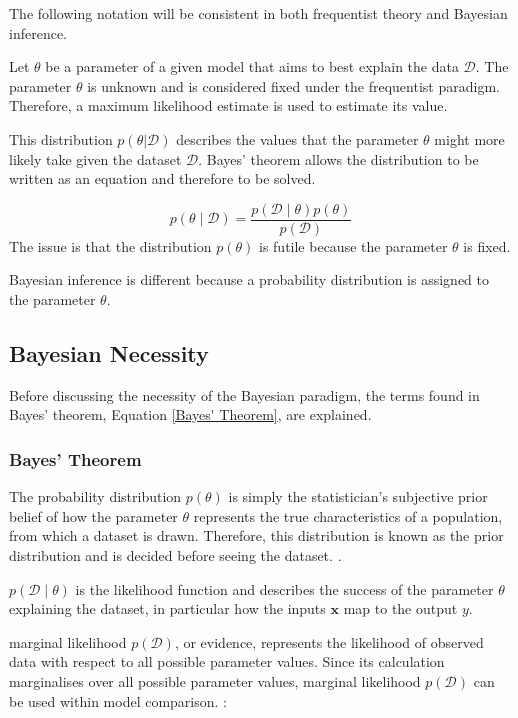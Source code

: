 \documentclass[12pt,a4paper]{article}
\begin{document}
The following notation will be consistent in both frequentist theory and Bayesian inference.

Let \(\theta\) be a parameter of a given model that aims to best explain the data \(\mathcal{D}\). The parameter \(\theta\) is unknown and is considered fixed under the frequentist paradigm. Therefore, a maximum likelihood estimate is used to estimate its value.

This distribution \(p(\theta|\mathcal{D})\) describes the values that the parameter \(\theta\) might more likely take given the dataset \(\mathcal{D}\). Bayes' theorem allows the distribution to be written as an equation and therefore to be solved.

\begin{equation}
p(\theta\mid\mathcal{D}) = \frac{p(\mathcal{D}\mid\theta)p(\theta)}{p(\mathcal{D})}
\label{Bayes' Theorem}
\end{equation}
The issue is that the distribution \(p(\theta)\) is futile because the parameter \(\theta\) is fixed. 

Bayesian inference is different because a probability distribution is assigned to the parameter \(\theta\).

\subsection{Bayesian Necessity}

Before discussing the necessity of the Bayesian paradigm, the terms found in Bayes' theorem, Equation \eqref{Bayes' Theorem}, are explained.

\subsubsection{Bayes' Theorem}
\label{sec:Bayes' Theorem}
The probability distribution \(p(\theta)\) is simply the statistician's subjective prior belief of how the parameter \(\theta\) represents the true characteristics of a population,  from which a dataset is drawn. Therefore, this distribution is known as the prior distribution and is decided before seeing the dataset. \citep{hoff2009first}.

\(p(\mathcal{D}\mid\theta)\) is the likelihood function and describes the success of the parameter \(\theta\) explaining the dataset, in particular how the inputs \(\bm{\mathbf{x}}\) map to the output \(y\).

marginal likelihood \(p(\mathcal{D})\), or evidence, represents the likelihood of observed data with respect to all possible parameter values. Since its calculation marginalises over all possible parameter values, marginal likelihood \(p(\mathcal{D})\) can be used within model comparison. \citep{gelman1995bayesian}:
\end{document}
